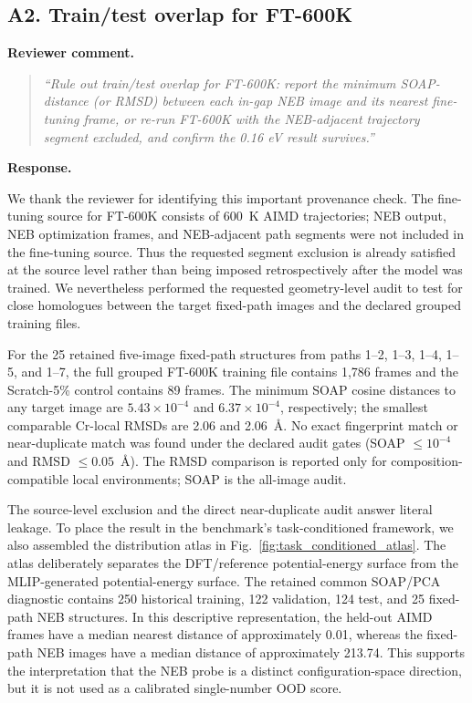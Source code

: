 \subsection*{A2. Train/test overlap for FT-600K}

\noindent\textbf{Reviewer comment.}
\begin{quote}
\itshape
``Rule out train/test overlap for FT-600K: report the minimum SOAP-distance (or RMSD) between each in-gap NEB image and its nearest fine-tuning frame, or re-run FT-600K with the NEB-adjacent trajectory segment excluded, and confirm the 0.16 eV result survives.''
\end{quote}

\noindent\textbf{Response.}

We thank the reviewer for identifying this important provenance check. The
fine-tuning source for FT-600K consists of 600~K AIMD trajectories; NEB output,
NEB optimization frames, and NEB-adjacent path segments were not included in
the fine-tuning source. Thus the requested segment exclusion is already
satisfied at the source level rather than being imposed retrospectively after
the model was trained. We nevertheless performed the requested geometry-level
audit to test for close homologues between the target fixed-path images and
the declared grouped training files.

For the 25 retained five-image fixed-path structures from paths 1--2, 1--3,
1--4, 1--5, and 1--7, the full grouped FT-600K training file contains 1,786
frames and the Scratch-5\% control contains 89 frames. The minimum SOAP cosine
distances to any target image are $5.43\times10^{-4}$ and
$6.37\times10^{-4}$, respectively; the smallest comparable Cr-local RMSDs
are 2.06 and 2.06~\AA. No exact fingerprint match or near-duplicate match was
found under the declared audit gates (SOAP $\le 10^{-4}$ and RMSD $\le
0.05$~\AA). The RMSD comparison is reported only for composition-compatible
local environments; SOAP is the all-image audit.

The source-level exclusion and the direct near-duplicate audit answer literal
leakage. To place the result in the benchmark's task-conditioned framework, we
also assembled the distribution atlas in Fig.~\ref{fig:task_conditioned_atlas}.
The atlas deliberately separates the DFT/reference potential-energy surface
from the MLIP-generated potential-energy surface. The retained common
SOAP/PCA diagnostic contains 250 historical training, 122 validation, 124
test, and 25 fixed-path NEB structures. In this descriptive representation,
the held-out AIMD frames have a median nearest distance of approximately
0.01, whereas the fixed-path NEB images have a median distance of
approximately 213.74. This supports the interpretation that the NEB probe is
a distinct configuration-space direction, but it is not used as a calibrated
single-number OOD score.

